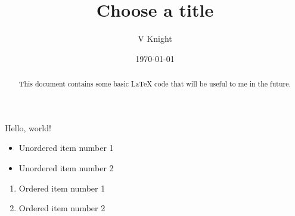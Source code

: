 \documentclass{article} %
\title{Choose a title}
\author{V Knight}
\date{\today}
\begin{document}

\begin{abstract}
    This document contains some basic LaTeX code that will be useful to me
    in the future.
\end{abstract}

\maketitle

Hello, world!

\begin{itemize}
	\item Unordered item number 1
	\item Unordered item number 2
\end{itemize}

\begin{enumerate}
	\item Ordered item number 1
	\item Ordered item number 2
\end{enumerate}
\end{document}
